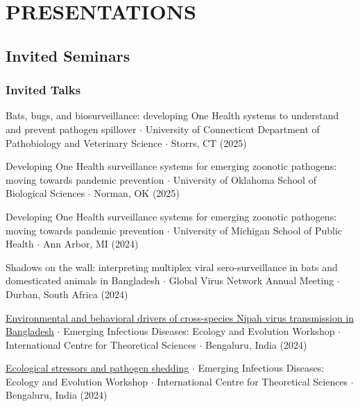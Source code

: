 \documentclass{cv}
\begin{document}


\section*{PRESENTATIONS}

\subsection*{Invited Seminars}

\subsubsection*{Invited Talks}

Bats, bugs, and biosurveillance: developing One Health systems to understand and prevent pathogen spillover $\cdot$ University of Connecticut Department of Pathobiology and Veterinary Science $\cdot$ Storrs, CT (2025)

Developing One Health surveillance systems for emerging zoonotic pathogens: moving towards pandemic prevention $\cdot$ University of Oklahoma School of Biological Sciences $\cdot$ Norman, OK (2025)

Developing One Health surveillance systems for emerging zoonotic pathogens: moving towards pandemic prevention $\cdot$ University of Michigan School of Public Health $\cdot$ Ann Arbor, MI (2024)

Shadows on the wall: interpreting multiplex viral sero-surveillance in bats and domesticated animals in Bangladesh $\cdot$ Global Virus Network Annual Meeting $\cdot$ Durban, South Africa (2024)

\href{https://www.youtube.com/live/MOgTl1EUSes?si=iMqpRzL8OlzRsdlE}{Environmental and behavioral drivers of cross-species Nipah virus transmission in Bangladesh} $\cdot$ 
Emerging Infectious Diseases: Ecology and Evolution Workshop $\cdot$ International Centre for Theoretical Sciences $\cdot$ Bengaluru, India (2024)

\href{https://www.youtube.com/live/WlhZYbyfGiw?si=1AW1gtXbbL0bbaPp}{Ecological stressors and pathogen shedding} $\cdot$ Emerging Infectious Diseases: Ecology and Evolution Workshop $\cdot$ International Centre for Theoretical Sciences $\cdot$ Bengaluru, India (2024)
\end{document}
